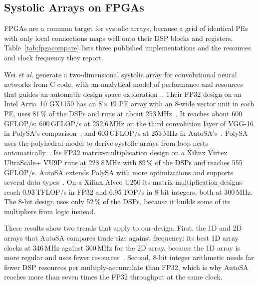\subsection{Systolic Arrays on FPGAs}
FPGAs are a common target for systolic arrays, because a grid of identical PEs with only local connections maps well onto their DSP blocks and registers. Table~\ref{tab:fpgacompare} lists three published implementations and the resources and clock frequency they report.

Wei \emph{et al.} generate a two-dimensional systolic array for convolutional neural networks from C code, with an analytical model of performance and resources that guides an automatic design space exploration~\cite{wei2017automated}. Their FP32 design on an Intel Arria~10 GX1150 has an $8 \times 19$ PE array with an 8-wide vector unit in each PE, uses 81\,\% of the DSPs and runs at about 253\,MHz~\cite{wang2021autosa}. It reaches about 600\,GFLOP/s: 600\,GFLOP/s at 252.6\,MHz on the third convolution layer of VGG-16 in PolySA's comparison~\cite{cong2018polysa}, and 603\,GFLOP/s at 253\,MHz in AutoSA's~\cite{wang2021autosa}. PolySA uses the polyhedral model to derive systolic arrays from loop nests automatically~\cite{cong2018polysa}. Its FP32 matrix-multiplication design on a Xilinx Virtex UltraScale+ VU9P runs at 228.8\,MHz with 89\,\% of the DSPs and reaches 555\,GFLOP/s. AutoSA extends PolySA with more optimizations and supports several data types~\cite{wang2021autosa}. On a Xilinx Alveo U250 its matrix-multiplication designs reach 0.93\,TFLOP/s in FP32 and 6.95\,TOP/s in 8-bit integers, both at 300\,MHz. The 8-bit design uses only 52\,\% of the DSPs, because it builds some of its multipliers from logic instead.

These results show two trends that apply to our design. First, the 1D and 2D arrays that AutoSA compares trade size against frequency: its best 1D array clocks at 346\,MHz against 300\,MHz for the 2D array, because the 1D array is more regular and uses fewer resources~\cite{wang2021autosa}. Second, 8-bit integer arithmetic needs far fewer DSP resources per multiply-accumulate than FP32, which is why AutoSA reaches more than seven times the FP32 throughput at the same clock.

